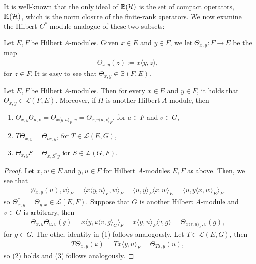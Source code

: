 It is well-known that the only ideal of $\mathbb{B}(\mathcal{H})$ is the set of compact operators, $\mathbb{K}(\mathcal{H})$, which is the norm closure of the finite-rank operators. We now examine the Hilbert $C^*$-module analogue of these two subsets:
\begin{definition}
	Let $E,F$ be Hilbert $A$-modules. Given $x \in E$ and $y \in F$, we let $\Theta_{x,y} \colon F \to E$ be the map
	\begin{align*}
		\Theta_{x,y}(z):=x \langle y,z \rangle,
	\end{align*}
	for $z \in F$. It is easy to see that $\Theta_{x,y} \in \mathbb{B}(F,E)$. 
\end{definition}
\begin{proposition}
	Let $E,F$ be Hilbert $A$-modules. Then for every $x \in E$ and $y \in F$, it holds that $\Theta_{x,y} \in \mathcal{L}(F,E)$. Moreover, if $H$ is another Hilbert $A$-module, then
	\begin{enumerate}
		\item $\Theta_{x,y}\Theta_{u,v}=\Theta_{x \langle y,u \rangle_F,v} = \Theta_{x,v \langle u,v\rangle_F}$, for $u \in F$ and $v \in G$,
		\item $T \Theta_{x,y} = \Theta_{tx,y}$, for $T \in \mathcal{L}(E,G)$,
		\item $\Theta_{x,y}S = \Theta_{x,S^* y}$ for $S \in \mathcal{L}(G,F)$.
	\end{enumerate}
	\label{frnkideal}
\end{proposition}
\begin{proof}
Let $x,w \in E$ and $y,u \in F$ for Hilbert $A$-modules $E,F$ as above. Then, we see that
\begin{align*}
		\langle \theta_{x,y}(u),w\rangle_E = \langle x \langle y,u\rangle_{F}, w\rangle_{E} = \langle u,y \rangle_F \langle x,w\rangle_E = \langle u, y\langle x,w\rangle_E \rangle_F,
\end{align*}
so $\Theta_{x,y}^* = \Theta_{y,x} \in \mathcal{L}(E,F)$. Suppose that $G$ is another Hilbert $A$-module and $v \in G$ is arbitrary, then
\begin{align*}
	\Theta_{x,y}\Theta_{u,v}(g) = x \langle y, u \langle v,g \rangle_G \rangle_F = x \langle y, u \rangle_F \langle v,g \rangle=\Theta_{x \langle y,u \rangle_F, v}(g),
\end{align*}
for $g \in G$. The other identity in (1) follows analogously. Let $T \in \mathcal{L}(E,G)$, then
\begin{align*}
	T \Theta_{x,y}(u) = T x \langle y,u \rangle_F = \Theta_{Tx,y}(u),
\end{align*}
so (2) holds and (3) follows analogously.
\end{proof}
